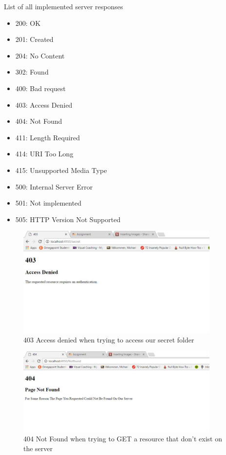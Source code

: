 \documentclass[a4paper,12pt]{article}
\numberwithin{figure}{section}
\begin{document}
List of all implemented server responses
\begin{itemize}
	\item 200: OK
	\item 201: Created
	\item 204: No Content
	\item 302: Found
	\item 400: Bad request
	\item 403: Access Denied
	\item 404: Not Found
	\item 411: Length Required
	\item 414: URI Too Long
	\item 415: Unsupported Media Type
	\item 500: Internal Server Error
	\item 501: Not implemented
	\item 505: HTTP Version Not Supported
\end{itemize}

\begin{figure}[h!]
	\centering
	\label{Access denied}
	\includegraphics[width=0.90\textwidth,keepaspectratio]{img/403.jpg} 
	\caption{403 Access denied when trying to access our secret folder}
\end{figure}

\begin{figure}[h!]
	\centering
	\label{not found}
	\includegraphics[width=0.90\textwidth,keepaspectratio]{img/404.jpg} 
	\caption{404 Not Found when trying to GET a resource that don't exist on the server}
\end{figure}
\end{document}

